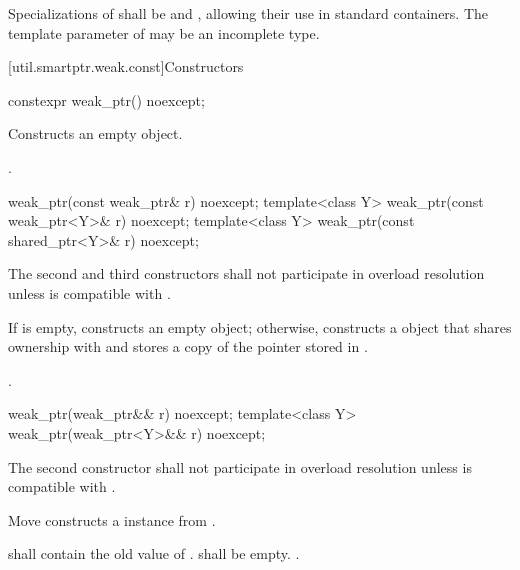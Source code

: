 \pnum
Specializations of  shall be  and
, allowing their use in standard
containers.  The template parameter  of  may be an
incomplete type.

[util.smartptr.weak.const]{Constructors}

%
\begin{itemdecl}
constexpr weak_ptr() noexcept;
\end{itemdecl}

\begin{itemdescr}
\pnum\effects  Constructs an empty  object.

\pnum\ensures  {}.
\end{itemdescr}

%
\begin{itemdecl}
weak_ptr(const weak_ptr& r) noexcept;
template<class Y> weak_ptr(const weak_ptr<Y>& r) noexcept;
template<class Y> weak_ptr(const shared_ptr<Y>& r) noexcept;
\end{itemdecl}

\begin{itemdescr}
\pnum\remarks The second and third constructors shall not participate in
overload resolution unless  is compatible with .

\pnum\effects  If  is empty, constructs
an empty  object; otherwise, constructs
a  object that shares ownership
with  and stores a copy of the pointer stored in .

\pnum\ensures  {}.
\end{itemdescr}

%
\begin{itemdecl}
weak_ptr(weak_ptr&& r) noexcept;
template<class Y> weak_ptr(weak_ptr<Y>&& r) noexcept;
\end{itemdecl}

\begin{itemdescr}
\pnum\remarks The second constructor shall not participate in overload resolution unless
 is compatible with .

\pnum\effects Move constructs a  instance from .

\pnum\ensures {} shall contain the old value of .
 shall be empty. .
\end{itemdescr}

